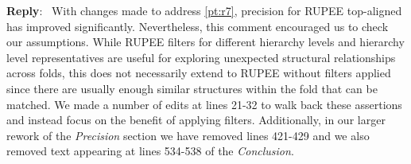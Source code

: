 \documentclass[11pt]{article}
\newcounter{reviewer}
\newcounter{point}[reviewer]
\renewcommand{\thepoint}{P\,\thereviewer.\arabic{point}}
\newcommand{\shortpoint}[1]{\refstepcounter{point}  \bigskip \noindent 
	{\textbf{Reviewer~Point~\thepoint} } ---~#1\par }
\newenvironment{reply}
   {\medskip \noindent \begin{sf}\textbf{Reply}:\  }
   {\medskip \end{sf}}
\newcommand{\shortreply}[2][]{\medskip \noindent \begin{sf}\textbf{Reply}:\  #2
	\ifthenelse{\equal{#1}{}}{}{ \hfill \footnotesize (#1)}%
	\medskip \end{sf}}
\begin{document}
\begin{reply}
With changes made to address \ref{pt:r7}, precision for RUPEE top-aligned has improved significantly. 
Nevertheless, this comment encouraged us to check our assumptions.
While RUPEE filters for different hierarchy levels and hierarchy level representatives are useful for exploring unexpected structural relationships across folds, this does not necessarily extend to RUPEE without filters applied since there are usually enough similar structures within the fold that can be matched. 
We made a number of edits at lines 21-32 to walk back these assertions and instead focus on the benefit of applying filters.
Additionally, in our larger rework of the \emph{Precision} section we have removed lines 421-429 and we also removed text appearing at lines 534-538 of the \emph{Conclusion}.
\end{reply}




\end{document}
